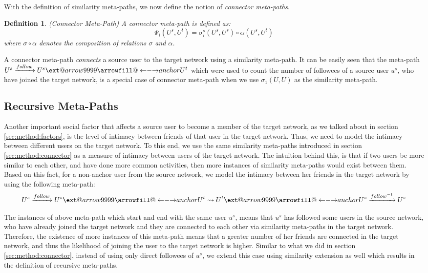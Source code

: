 \documentclass[conference]{IEEEtran}
\makeatletter
\newtheorem{definition}{Definition}[section]
\newcommand\xleftrightarrow[2][]{%
  \ext@arrow 9999{\longleftrightarrowfill@}{#1}{#2}}
\newcommand\longleftrightarrowfill@{%
  \arrowfill@\leftarrow\relbar\rightarrow}
\makeatother
\begin{document}
With the definition of similarity meta-paths, we now define the notion of \textit{connector meta-paths}.

\begin{definition}{(Connector Meta-Path)}
A connector meta-path is defined as:
\begin{equation}
\Psi_i(U^s,U^t)=\sigma^s_i(U^s,U^s)\circ\alpha(U^s,U^t)
\end{equation}
where $\sigma\circ\alpha$ denotes the composition of relations $\sigma$ and $\alpha$.
\end{definition}

A connector meta-path \textit{connects} a source user to the target network using a similarity meta-path. It can be easily seen that the meta-path $U^s\xrightarrow{follow}U^s\xleftrightarrow{anchor}U^t$ which were used to count the number of followees of a source user $u^s$, who have joined the target network, is a special case of connector meta-path when we use $\sigma_1(U,U)$ as the similarity meta-path.

\subsection{Recursive Meta-Paths}

Another important social factor that affects a source user to become a member of the target network, as we talked about in section \ref{sec:method:factors}, is the level of intimacy between friends of that user in the target network. Thus, we need to model the intimacy between different users on the target network. To this end, we use the same similarity meta-paths introduced in section \ref{sec:method:connector} as a measure of intimacy between users of the target network. The intuition behind this, is that if two users be more similar to each other, and have done more common activities, then more instances of similarity meta-paths would exist between them. Based on this fact, for a non-anchor user from the source network, we model the intimacy between her friends in the target network by using the following meta-path:
\[
U^s\xrightarrow{follow}U^s\xleftrightarrow{anchor}U^t\rightsquigarrow U^t\xleftrightarrow{anchor}U^s\xrightarrow{follow^{-1}}U^s
\]

The instances of above meta-path which start and end with the same user $u^s$, means that $u^s$ has followed some users in the source network, who have already joined the target network and they are connected to each other via similarity meta-paths in the target network. Therefore, the existence of more instances of this meta-path means that a greater number of her friends are connected in the target network, and thus the likelihood of joining the user to the target network is higher. Similar to what we did in section \ref{sec:method:connector}, instead of using only direct followees of $u^s$, we extend this case using similarity extension as well which results in the definition of recursive meta-paths.
\end{document}
